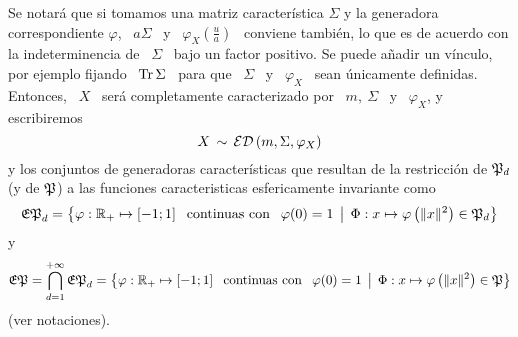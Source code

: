 %
Se notar\'a que si tomamos  una matriz caracter\'istica $\Sigma$ y la generadora
correspondiente  $\varphi$, \  $a  \Sigma$ \  y  \ $\varphi_X\left(  \frac{u}{a}
\right)$ \ conviene tambi\'en, lo que  es de acuerdo con la indeterminencia de \
$\Sigma$ \ bajo un factor positivo.  Se puede a\~nadir un v\'inculo, por ejemplo
fijando  \  $\operatorname{Tr} \Sigma$  \  para  que  \ $\Sigma$  \  y  \ $\varphi_X$  \  sean
\'unicamente definidas. Entonces, \ $X$ \ ser\'a completamente caracterizado por
\ $m, \: \Sigma$ \ y \ $\varphi_X$, y escribiremos
%
\[
X \, \sim \, \mathcal{ED} \left( m , \Sigma , \varphi_X \right)
\]
%
y   los  conjuntos  de   generadoras  caracter\'isticas   que  resultan   de  la
restricci\'on  de   $\mathfrak{P}_d$  (y  de  $\mathfrak{P}$)  a   las  funciones  caracteristicas
esfericamente invariante como
%
\[
\mathfrak{EP}_d = \big\{ 
\varphi: \mathbb{R}_+ \mapsto [-1 ; 1]  \:\: \mbox{  continuas con } \:\: \varphi(0) = 1  \:\: \big| \:\: \Phi: 
x \mapsto \varphi\left( \| x \|^2 \right)
\in \mathfrak{P}_d \big\}
\]
%
y
%
\[
\mathfrak{EP} = \bigcap_{d=1}^{+\infty} \mathfrak{EP}_d = \big\{ 
\varphi: \mathbb{R}_+ \mapsto [-1 ; 1]  \:\: \mbox{  continuas con } \:\: \varphi(0) = 1  \:\: \big| \:\: \Phi: 
x \mapsto \varphi\left( \| x \|^2 \right)
\in \mathfrak{P} \big\}
\]
%
(ver notaciones).

